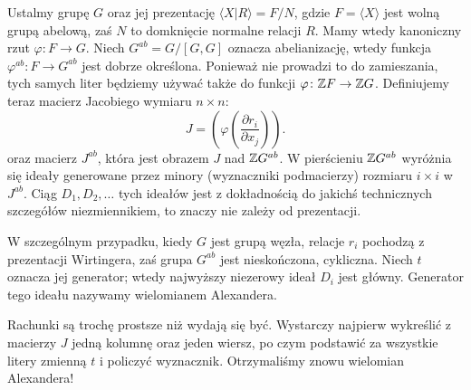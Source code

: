 Ustalmy grupę $G$ oraz jej prezentację $\langle X | R \rangle = F/N$, gdzie $F = \langle X \rangle$ jest wolną grupą abelową, zaś $N$ to domknięcie normalne relacji $R$.
Mamy wtedy kanoniczny rzut $\varphi \colon F \to G$.
Niech $G^{ab} = G/[G, G]$ oznacza abelianizację, wtedy funkcja $\varphi^{ab} \colon F \to G^{ab}$ jest dobrze określona.
Ponieważ nie prowadzi to do zamieszania, tych samych liter będziemy używać także do funkcji $\varphi \colon \mathbb Z F \to \mathbb Z G$.
Definiujemy teraz macierz Jacobiego wymiaru $n \times n$:
%
\begin{equation}
    J = \left(\varphi \left(\frac{\partial r_i}{\partial x_j}\right) \right).
\end{equation}
oraz macierz $J^{ab}$, która jest obrazem $J$ nad $\mathbb Z G^{ab}$.
W pierścieniu $\mathbb Z G^{ab}$ wyróżnia się ideały generowane przez minory (wyznaczniki podmacierzy) rozmiaru $i \times i$ w $J^{ab}$.
Ciąg $D_1, D_2, \ldots$ tych ideałów jest z dokładnością do jakichś technicznych szczegółów niezmiennikiem, to znaczy nie zależy od prezentacji.

W szczególnym przypadku, kiedy $G$ jest grupą węzła, relacje $r_i$ pochodzą z prezentacji Wirtingera, zaś grupa $G^{ab}$ jest nieskończona, cykliczna.
Niech $t$ oznacza jej generator; wtedy najwyższy niezerowy ideał $D_i$ jest główny.
Generator tego ideału nazywamy wielomianem Alexandera.
%

Rachunki są trochę prostsze niż wydają się być.
Wystarczy najpierw wykreślić z macierzy $J$ jedną kolumnę oraz jeden wiersz, po czym podstawić za wszystkie litery zmienną $t$ i policzyć wyznacznik.
Otrzymaliśmy znowu wielomian Alexandera!

%


